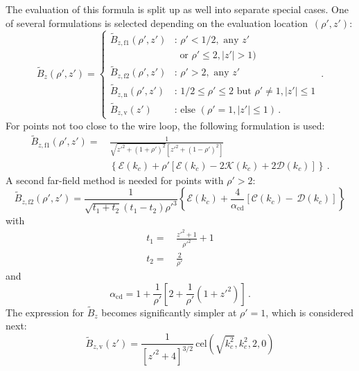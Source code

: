 The evaluation of this formula is split up as well into separate special cases.
One of several formulations is selected depending on the evaluation location~$(\rho', z')$:
\begin{equation}
  \tilde{B}_z(\rho', z')
  = \begin{cases}
      \tilde{B}_{z,\mathrm{f1}} (\rho', z') &:\, \rho' < 1/2, \textrm{ any } z' \\
                ~                           &~ \textrm{ or } \rho' \leq 2, |z'| > 1) \\
      \tilde{B}_{z,\mathrm{f2}} (\rho', z') &:\, \rho' > 2, \textrm{ any } z' \\
      \tilde{B}_{z,\mathrm{n}}  (\rho', z') &:\, 1/2 \leq \rho' \leq 2 \textrm{ but } \rho' \neq 1, |z'| \leq 1 \\
      \tilde{B}_{z,\mathrm{v}}  (z') &:\, \textrm{else } (\rho' = 1, |z'| \leq 1) \, .
    \end{cases} \label{eqn:cwl_B_z_switchover} \, .
\end{equation}
For points not too close to the wire loop, the following formulation is used:
\begin{align}
  \tilde{B}_{z,\mathrm{f1}} (\rho', z')
  =&\, \frac{1}{\sqrt{{z'}^2 + (1+\rho')^2} \left[{z'}^2 + (1 - \rho')^2 \right] } \nonumber \\
  ~&\,  \left\{ \mathcal{E}(k_c) + \rho' \left[ \mathcal{E}(k_c) - 2 \mathcal{K}(k_c) + 2 \mathcal{D}(k_c) \right] \right\} \, . \label{eqn:cwl_B_z_f1}
\end{align}
A second far-field method is needed for points with $\rho' > 2$:
\begin{equation}
  \tilde{B}_{z,\mathrm{f2}} (\rho', z')
  = \frac{1}{\sqrt{t_1 + t_2}(t_1-t_2) {\rho'}^3}
    \left\{ \mathcal{E}(k_c) + \frac{4}{\alpha_\mathrm{cd}} \left[ \mathcal{C}(k_c) - \,\mathcal{D}(k_c) \right] \right\} \label{eqn:cwl_B_z_f2}
\end{equation}
with
\begin{align}
  t_1 =&\, \frac{z'^2 + 1}{\rho'^2} + 1 \\
  t_2 =&\, \frac{2}{\rho'}
\end{align}
and
\begin{equation}
  \alpha_\mathrm{cd} = 1 + \frac{1}{\rho'} \left[ 2 + \frac{1}{\rho'} \left( 1 + {z'}^2 \right) \right] \, .
\end{equation}
The expression for $\tilde{B}_z$ becomes significantly simpler at $\rho'=1$,
which is considered next:
\begin{equation}
  \tilde{B}_{z,\mathrm{v}} (z')
  = \frac{1}{\left[ {z'}^2 + 4 \right]^{3/2}} \,\mathrm{cel}\left(\sqrt{k_c^2}, k_c^2, 2, 0 \right) \label{eqn:cwl_B_z_v}
\end{equation}
